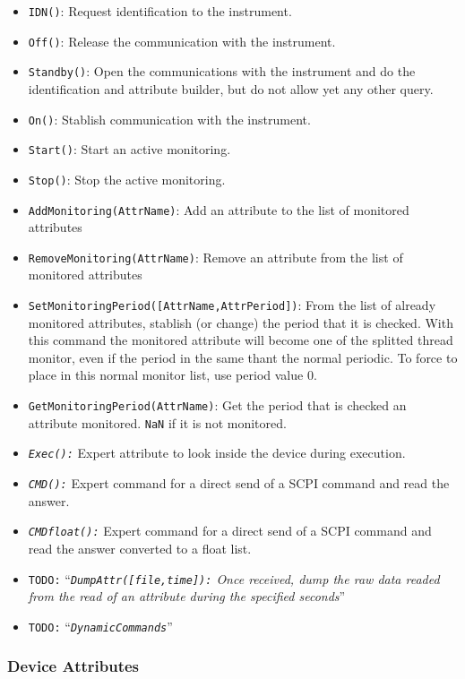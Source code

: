 \documentclass[a4paper,10pt]{article}
\newcommand{\todo}[1]{\texttt{\color{red}TODO:} ``\emph{#1}''}
\begin{document}
\begin{itemize}
    \item {\tt IDN()}: Request identification to the instrument.
    \item {\tt Off()}: Release the communication with the instrument.
    \item {\tt Standby()}: Open the communications with the instrument and do the identification and attribute builder, but do not allow yet any other query.
    \item {\tt On()}: Stablish communication with the instrument.
    \item {\tt Start()}: Start an active monitoring.
    \item {\tt Stop()}: Stop the active monitoring.
    \item {\tt AddMonitoring(AttrName)}: Add an attribute to the list of monitored attributes
    \item {\tt RemoveMonitoring(AttrName)}: Remove an attribute from the list of monitored attributes
    \item {\tt SetMonitoringPeriod([AttrName,AttrPeriod])}: From the list of already monitored attributes, stablish (or change) the period that it is checked. With this command the monitored attribute will become one of the splitted thread monitor, even if the period in the same thant the normal periodic. To force to place in this normal monitor list, use period value $0$.
    \item {\tt GetMonitoringPeriod(AttrName)}: Get the period that is checked an attribute monitored. {\tt NaN} if it is not monitored.
    \item {\tt \emph{Exec():}} Expert attribute to look inside the device during execution.
    \item {\tt \emph{CMD():}} Expert command for a direct send of a SCPI command and read the answer.
    \item {\tt \emph{CMDfloat():}} Expert command for a direct send of a SCPI command and read the answer converted to a float list.
    \item \todo{{\tt \emph{DumpAttr([file,time]):}} Once received, dump the raw data readed from the read of an attribute during the specified
 seconds}
    \item \todo{{\tt DynamicCommands}}
\end{itemize}

\subsubsection{Device Attributes}\label{sec:devAttrs}
\end{document}
